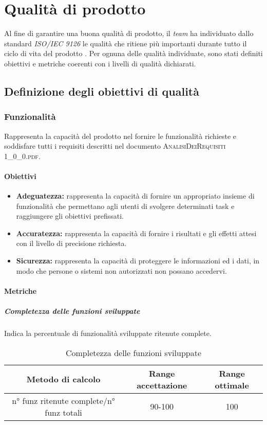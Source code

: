 \newpage
\section{Qualità di prodotto}
	
Al fine di garantire una buona qualità di prodotto, il \textit{team} ha individuato dallo standard \textit{ISO/IEC 9126} le qualità che ritiene più importanti durante tutto il ciclo di vita del prodotto \progetto. Per ognuna delle qualità individuate, sono stati definiti obiettivi e metriche coerenti con i livelli di qualità dichiarati.

\subsection{Definizione degli obiettivi di qualità}

	\subsubsection{Funzionalità}
	Rappresenta la capacità del prodotto nel fornire le funzionalità richieste e soddisfare tutti i requisiti descritti nel documento \textsc{AnalisiDeiRequisiti 1\_0\_0.pdf}.
		
		\paragraph{Obiettivi}
			\begin{itemize}
				\item \textbf{Adeguatezza:} rappresenta la capacità di fornire un appropriato insieme di funzionalità che permettano agli utenti di svolgere determinati task e raggiungere gli obiettivi prefissati.
				\item \textbf{Accuratezza:} rappresenta la capacità di fornire i risultati e gli effetti attesi con il livello di precisione richiesta.
				\item \textbf{Sicurezza:} rappresenta la capacità di proteggere le informazioni ed i dati, in modo che persone o sistemi non autorizzati non possano accedervi.
			\end{itemize}
		
		\paragraph{Metriche}
			\subparagraph{Completezza delle funzioni sviluppate}
			Indica la percentuale di funzionalità sviluppate ritenute complete.
				\begin{table}[H]
					\begin{center}
						\begin{tabular}{|c|c|c|}
							\hline
							\textbf{Metodo di calcolo} & \textbf{Range accettazione} & \textbf{Range ottimale} \\
							\hline
							n° funz ritenute complete/n° funz totali & 90-100 & 100 \\
							\hline
						\end{tabular}
					\end{center}
					\caption{Completezza delle funzioni sviluppate}
				\end{table}
			
